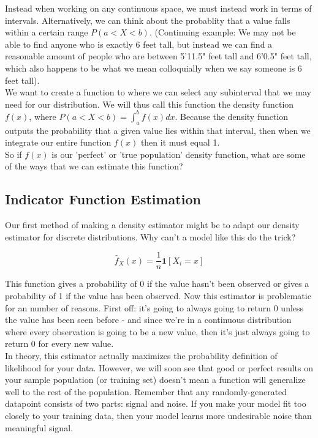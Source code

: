 \documentclass[12pt]{article}
\begin{document}
Instead when working on any continuous space, we must instead work in terms of intervals. Alternatively, we can think about the probablity that a value falls within a certain range $P(a < X < b)$. (Continuing example: We may not be able to find anyone who is exactly 6 feet tall, but instead we can find a reasonable amount of people who are between 5'11.5" feet tall and 6'0.5" feet tall, which also happens to be what we mean colloquially when we say someone is 6 feet tall). \\

We want to create a function to where we can select any subinterval that we may need for our distribution. We will thus call this function the density function $f(x)$, where $P(a < X < b) = \int_{a}^{b} f(x) dx$. Because the density function outputs the probability that a given value lies within that interval, then when we integrate our entire function $f(x)$ then it must equal 1. \\

So if $f(x)$ is our 'perfect' or 'true population' density function, what are some of the ways that we can estimate this function? \\

\subsection{Indicator Function Estimation}

Our first method of making a density estimator might be to adapt our density estimator for discrete distributions. Why can't a model like this do the trick?

$$\hat{f}_X(x) = \frac{1}{n} \mathbf{1}[ X_i = x ]$$

This function gives a probability of 0 if the value hasn't been observed or gives a probability of 1 if the value has been observed. Now this estimator is problematic for an number of reasons. First off: it's going to always going to return 0 unless the value has been seen before - and since we're in a continuous distribution where every observation is going to be a new value, then it's just always going to return 0 for every new value. \\

In theory, this estimator actually maximizes the probability definition of likelihood for your data. However, we will soon see that good or perfect results on your sample population (or training set) doesn't mean a function will generalize well to the rest of the population. Remember that any randomly-generated datapoint consists of two parts: signal and noise. If you make your model fit too closely to your training data, then your model learns more undesirable noise than meaningful signal. \\
\end{document}

